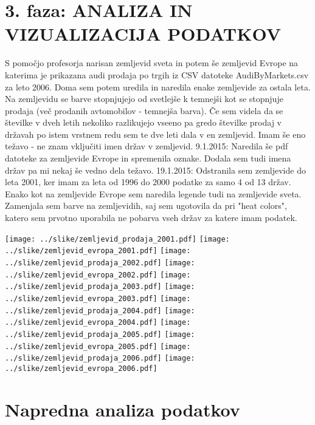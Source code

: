 \documentclass[11pt,a4paper]{article}
\begin{document}
\section{3. faza: ANALIZA IN VIZUALIZACIJA PODATKOV}
S pomočjo profesorja narisan zemljevid sveta in potem še zemljevid Evrope na katerima je prikazana audi prodaja po trgih iz CSV datoteke AudiByMarkets.csv za leto 2006. Doma sem potem uredila in naredila enake zemljevide za ostala leta. Na zemljevidu se barve stopnjujejo od svetlejše k temnejši kot se stopnjuje prodaja (več prodanih avtomobilov - temnejša barva). Če sem videla da se številke v dveh letih nekoliko razlikujejo vseeno pa gredo številke prodaj v državah po istem vrstnem redu sem te dve leti dala v en zemljevid. Imam še eno težavo - ne znam vključiti imen držav v zemljevid.
9.1.2015: Naredila še pdf datoteke za zemljevide Evrope in spremenila oznake. Dodala sem tudi imena držav pa mi nekaj še vedno dela težavo.
19.1.2015: Odstranila sem zemljevide do leta 2001, ker imam za leta od 1996 do 2000 podatke za samo 4 od 13 držav. Enako kot na zemljevide Evrope sem naredila legende tudi na zemljevide sveta. Zamenjala sem barve na zemljevidih, saj sem ugotovila da pri "heat colors", katero sem prvotno uporabila ne pobarva vseh držav za katere imam podatek.


\texttt{[image: ../slike/zemljevid\_prodaja\_2001.pdf]}
\texttt{[image: ../slike/zemljevid\_evropa\_2001.pdf]}
\texttt{[image: ../slike/zemljevid\_prodaja\_2002.pdf]}
\texttt{[image: ../slike/zemljevid\_evropa\_2002.pdf]}
\texttt{[image: ../slike/zemljevid\_prodaja\_2003.pdf]}
\texttt{[image: ../slike/zemljevid\_evropa\_2003.pdf]}
\texttt{[image: ../slike/zemljevid\_prodaja\_2004.pdf]}
\texttt{[image: ../slike/zemljevid\_evropa\_2004.pdf]}
\texttt{[image: ../slike/zemljevid\_prodaja\_2005.pdf]}
\texttt{[image: ../slike/zemljevid\_evropa\_2005.pdf]}
\texttt{[image: ../slike/zemljevid\_prodaja\_2006.pdf]}
\texttt{[image: ../slike/zemljevid\_evropa\_2006.pdf]}

\section{Napredna analiza podatkov}

\end{document}
